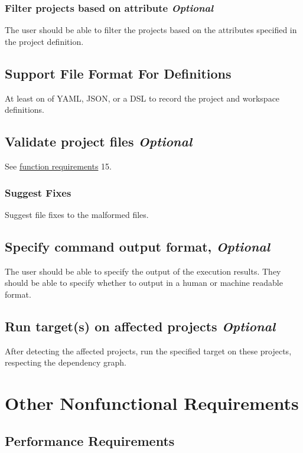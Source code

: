 \documentclass[11pt]{article}
\begin{document}
\subsubsection{Filter projects based on attribute \emph{Optional}}

The user should be able to filter the projects based on the attributes specified
in the project definition.

\subsection{Support File Format For Definitions}

At least on of YAML, JSON, or a \gls{DSL} to record the project and workspace definitions.

\subsection{Validate project files \emph{Optional}}

See \hyperref[sec:fun_req]{function requirements} 15.

\subsubsection{Suggest Fixes}

Suggest file fixes to the malformed files.

\subsection{Specify command output format, \emph{Optional}}

The user should be able to specify the output of the execution results. They
should be able to specify whether to output in a human or machine readable
format.

\subsection{Run target(s) on affected projects \emph{Optional}}

After detecting the affected projects, run the specified target on these
projects, respecting the dependency graph.

\section{Other Nonfunctional Requirements}

\subsection{Performance Requirements}
\end{document}
